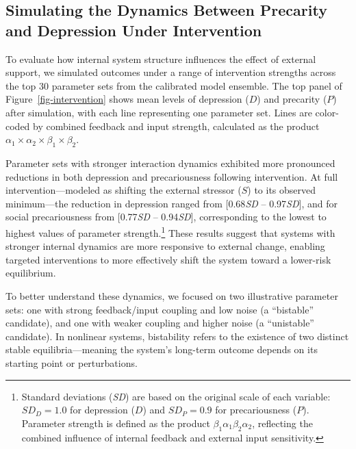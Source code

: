 \documentclass[
]{article}
\begin{document}
\subsection{Simulating the Dynamics Between Precarity and Depression
Under
Intervention}\label{simulating-the-dynamics-between-precarity-and-depression-under-intervention}

To evaluate how internal system structure influences the effect of
external support, we simulated outcomes under a range of intervention
strengths across the top 30 parameter sets from the calibrated model
ensemble. The top panel of Figure~\ref{fig-intervention} shows mean
levels of depression (\(D\)) and precarity (\(P\)) after simulation,
with each line representing one parameter set. Lines are color-coded by
combined feedback and input strength, calculated as the product
\(\alpha_1 \times \alpha_2 \times \beta_1 \times \beta_2\).

Parameter sets with stronger interaction dynamics exhibited more
pronounced reductions in both depression and precariousness following
intervention. At full intervention---modeled as shifting the external
stressor (\(S\)) to its observed minimum---the reduction in depression
ranged from {[}0.68\emph{SD} -- 0.97\emph{SD}{]}, and for social
precariousness from {[}0.77\emph{SD} -- 0.94\emph{SD}{]}, corresponding
to the lowest to highest values of parameter strength.\footnote{Standard
  deviations (\emph{SD}) are based on the original scale of each
  variable: \(\textit{SD}_D = 1.0\) for depression (\(D\)) and
  \(\textit{SD}_P = 0.9\) for precariousness (\(P\)). Parameter strength
  is defined as the product \(\beta_1 \alpha_1 \beta_2 \alpha_2\),
  reflecting the combined influence of internal feedback and external
  input sensitivity.} These results suggest that systems with stronger
internal dynamics are more responsive to external change, enabling
targeted interventions to more effectively shift the system toward a
lower-risk equilibrium.

To better understand these dynamics, we focused on two illustrative
parameter sets: one with strong feedback/input coupling and low noise (a
``bistable'' candidate), and one with weaker coupling and higher noise
(a ``unistable'' candidate). In nonlinear systems, bistability refers to
the existence of two distinct stable equilibria---meaning the system's
long-term outcome depends on its starting point or perturbations.
\end{document}
